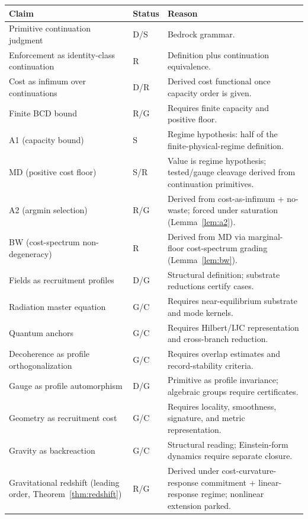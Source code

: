 \documentclass[11pt]{article}
\theoremstyle{remark}
\newcommand{\Status}[1]{\textsf{#1}}
\begin{document}
\begin{center}
\begin{longtable}{p{}p{}p{}}
\toprule
\textbf{Claim} & \textbf{Status} & \textbf{Reason}\\
\midrule
Primitive continuation judgment & \Status{D/S} & Bedrock grammar.\\
Enforcement as identity-class continuation & \Status{R} & Definition plus continuation equivalence.\\
Cost as infimum over continuations & \Status{D/R} & Derived cost functional once capacity order is given.\\
Finite BCD bound & \Status{R/G} & Requires finite capacity and positive floor.\\
A1 (capacity bound) & \Status{S} & Regime hypothesis: half of the finite-physical-regime definition.\\
MD (positive cost floor) & \Status{S/R} & Value is regime hypothesis; tested/gauge cleavage derived from continuation primitives.\\
A2 (argmin selection) & \Status{R/G} & Derived from cost-as-infimum + no-waste; forced under saturation (Lemma~\ref{lem:a2}).\\
BW (cost-spectrum non-degeneracy) & \Status{R} & Derived from MD via marginal-floor cost-spectrum grading (Lemma~\ref{lem:bw}).\\
Fields as recruitment profiles & \Status{D/G} & Structural definition; substrate reductions certify cases.\\
Radiation master equation & \Status{G/C} & Requires near-equilibrium substrate and mode kernels.\\
Quantum anchors & \Status{G/C} & Requires Hilbert/IJC representation and cross-branch reduction.\\
Decoherence as profile orthogonalization & \Status{G/C} & Requires overlap estimates and record-stability criteria.\\
Gauge as profile automorphism & \Status{D/G} & Primitive as profile invariance; algebraic groups require certificates.\\
Geometry as recruitment cost & \Status{G/C} & Requires locality, smoothness, signature, and metric representation.\\
Gravity as backreaction & \Status{G/C} & Structural reading; Einstein-form dynamics require separate closure.\\
Gravitational redshift (leading order, Theorem~\ref{thm:redshift}) & \Status{R/G} & Derived under cost-curvature-response commitment + linear-response regime; nonlinear extension parked.\\

\end{longtable}
\end{center}
\end{document}
